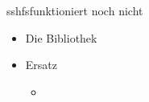 
\begin{frame}{sshfs}{funktioniert noch nicht}
 \begin{itemize}
  \item Die Bibliothek 
  \item Ersatz
  \begin{itemize}
   \item {}
  \end{itemize}
 \end{itemize}
\end{frame}

